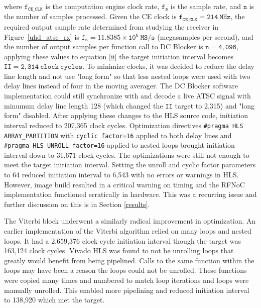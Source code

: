 \documentclass{article}
\begin{document}
where $\mathtt{f_{CE\_CLK}}$ is the computation engine clock rate, $\mathtt{f_{s}}$ is the sample rate, and $\mathtt{n}$ is the number of samples processed. Given the CE clock is $\mathtt{f_{CE\_CLK} = 214\ MHz}$, the required output sample rate determined from studying the receiver in Figure~\ref{uhd_atsc_rx} is $\mathtt{f_{s} = 11.8385\times10^{6}\ MS/s}$ (megasamples per second), and the number of output samples per function call to DC Blocker is $\mathtt{n = 4,096}$, applying these values to equation \ref{ii} the target initiation interval becomes $\mathtt{II = 2,314\ clock\ cycles}$. To minimize clocks, it was decided to reduce the delay line length and not use "long form" so that less nested loops were used with two delay lines instead of four in the moving averager. The DC Blocker software implementation could still synchronize with and decode a live ATSC signal with minumum delay line length 128 (which changed the $\mathtt{II}$ target to 2,315) and "long form" disabled. After applying these changes to the HLS source code, initiation interval reduced to 207,365 clock cycles. Optimization directives {\tt \#pragma  HLS ARRAY\_PARTITION} with {\tt cyclic factor=16} applied to both delay lines and {\tt \#pragma HLS UNROLL factor=16} applied to nested loops brought initiation interval down to 31,671 clock cycles. The optimizations were still not enough to meet the target initiation interval. Setting the unroll and cyclic factor parameters to 64 reduced initiation interval to 6,543 with no errors or warnings in HLS. However, image build resulted in a critical warning on timing and the RFNoC implementation functioned erratically in hardware. This was a recurring issue and further discussion on this is in Section \ref{results}.

The Viterbi block underwent a similarly radical improvement in optimization. An earlier implementation of the Viterbi algorithm relied on many loops and nested loops. It had a 2,659,376 clock cycle initiation interval though the target was 163,124 clock cycles. Vivado HLS was found to not be unrolling loops that greatly would benefit from being pipelined. Calls to the same function within the loops may have been a reason the loops could not be unrolled. These functions were copied many times and numbered to match loop iterations and loops were manually unrolled. This enabled more pipelining and reduced initiation interval to 138,920 which met the target.
\end{document}
